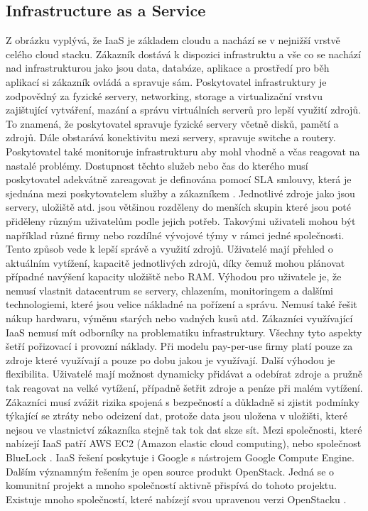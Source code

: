 \subsection{Infrastructure as a Service}
Z obrázku \cite{cloud-computing-service-model} vyplývá, že IaaS je základem cloudu a nachází se v nejnižší vrstvě celého cloud stacku. Zákazník dostává k dispozici infrastruktu a vše co se nachází nad infrastrukturou jako jsou data, databáze, aplikace a prostředí pro běh aplikací si zákazník ovládá a spravuje sám. Poskytovatel infrastruktury je zodpovědný za fyzické servery, networking, storage a virtualizační vrstvu zajištující vytváření, mazání a správu virtuálních serverů pro lepší využití zdrojů. To znamená, že poskytovatel spravuje fyzické servery včetně disků, pamětí a zdrojů. Dále obstarává konektivitu mezi servery, spravuje switche a routery. Poskytovatel také monitoruje infrastrukturu aby mohl vhodně a včas reagovat na nastalé problémy.\newline
Dostupnost těchto služeb nebo čas do kterého musí poskytovatel adekvátně zareagovat je definována pomocí SLA smlouvy, která je sjednána mezi poskytovatelem služby a zákazníkem \cite{Rongdong}.
Jednotlivé zdroje jako jsou servery, uložiště atd. jsou většinou rozděleny do  menších skupin které jsou poté přiděleny různým uživatelům podle jejich potřeb. Takovými uživateli mohou být například různé firmy nebo rozdílné vývojové týmy v rámci jedné společnosti. Tento způsob vede k lepší správě a využití zdrojů. Uživatelé mají přehled o aktuálním vytížení, kapacitě jednotlivých zdrojů, díky čemuž mohou plánovat případné navýšení kapacity uložiště nebo RAM.\newline
    Výhodou pro uživatele je, že nemusí vlastnit datacentrum se servery, chlazením, monitoringem a dalšími technologiemi, které jsou velice nákladné na pořízení a správu. Nemusí také řešit nákup hardwaru, výměnu starých nebo vadných kusů atd. Zákazníci využívající IaaS nemusí mít odborníky na  problematiku infrastruktury. Všechny tyto aspekty šetří pořizovací i provozní náklady. Při modelu pay-per-use firmy platí pouze za zdroje které využívají a pouze po dobu jakou je využívají. Další výhodou je flexibilita. Uživatelé mají možnost dynamicky přidávat a odebírat zdroje a pružně tak reagovat na velké vytížení, případně šetřit zdroje a peníze při malém vytížení. Zákazníci musí zvážit rizika spojená s bezpečností a důkladně si zjistit podmínky týkající se ztráty nebo odcizení dat, protože data jsou uložena v uložišti, které nejsou ve vlastnictví zákazníka stejně tak tok dat skze sít.\newline
    Mezi společnosti, které nabízejí IaaS patří AWS EC2 (Amazon elastic cloud computing), nebo společnost BlueLock  \cite{salah2011performance}. IaaS řešení poskytuje i Google s nástrojem Google Compute Engine. Dalším významným řešením je open source produkt OpenStack. Jedná se o komunitní projekt a  mnoho společností aktivně přispívá do tohoto projektu. Existuje mnoho společností, které nabízejí svou upravenou verzi OpenStacku \cite{singh2014critical}.

